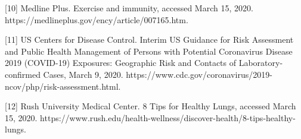 \documentclass[onecolumn,journal]{IEEEtran}
\begin{document}
[10] Medline Plus. Exercise and immunity, accessed March 15, 2020. https://medlineplus.gov/ency/article/007165.htm.

[11] US Centers for Disease Control. Interim US Guidance for Risk Assessment and Public Health Management of Persons with Potential Coronavirus Disease 2019 (COVID-19) Exposures: Geographic Risk and Contacts of Laboratory-confirmed Cases, March 9, 2020. https://www.cdc.gov/coronavirus/2019-ncov/php/risk-assessment.html.

[12] Rush University Medical Center. 8 Tips for Healthy Lungs, accessed March 15, 2020. https://www.rush.edu/health-wellness/discover-health/8-tips-healthy-lungs.

% 

\end{document}
